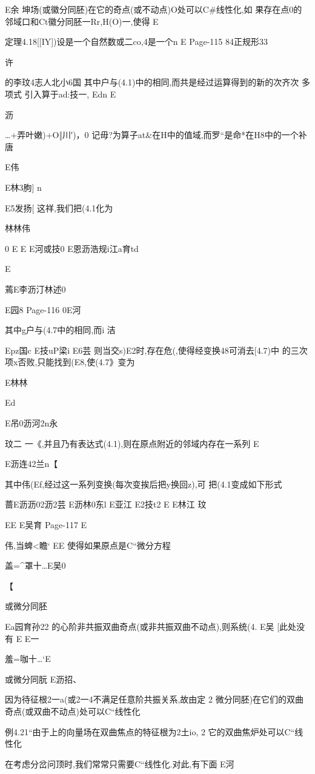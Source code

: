 {{E余
坤场(或徽分同胚)在它的奇点(或不动点)O处可以C#线性化,如
果存在点0的邻域口和Ct徽分同胚一Rr,H(O)一,使得
E

定理4.18[[IY])设是一个自然数或二co,4是一个n
E
Page-115
84正规形33

许

的李玟4志人北小6国
其中户与(4.1)中的相同,而共是经过运算得到的新的次齐次
多项式
引入算于ad:技一,
Edn
E

沥

…+弄叶嫩)+O‖川′)，0
记毋?为算子at&在H中的值域,而罗“是命*在H8中的一个补
唐

E伟

E林3朐]
n

E5发扬[
这祥,我们把(4.1化为

林林伟

0
E
E
E河或技0
E恩沥浩规i江a育td

E

蔫E李沥汀林述0

E园8
Page-116
0E河

其中g户与(4.7中的相同,而i
洁

Epz国c
E技uP梁i
E6芸
则当交s)E2时,存在危(,使得经变换48可消去[4.7)中
的三次项x否败,只能找到(E8,使(4.7》变为

E林林

Ed

E吊0沥河2n永

玟二
一《,并且乃有表达式(4.1),则在原点附近的邻域内存在一系列
E

E沥连42兰n【

其中伟(Ef,经过这一系列变换(每次变挨后把y换回z),可
把(4.1变成如下形式

蔷E沥沥02沥2芸
E沥林0东l
E亚江
E2技t2
E
E林江
玟

EE
E吴育
Page-117
E

伟,当蜱<瞻`
EE
使得如果原点是C“微分方程

盖=^罩十…E吴0

【

或微分同胚

Ea园育孙22
的心阶非共振双曲奇点(或非共振双曲不动点),则系统(4.
E吴
[此处没有
E
E一

羞=咖十…`E

或微分同朊
E沥招、

因为待征根2一a(或2一4不满足任意阶共振关系,故由定
2
微分同胚)在它们的双曲奇点(或双曲不动点)处可以C“线性化

例4.21“由于上的向量场在双曲焦点的特征根为2土io,
2
它的双曲焦炉处可以C“线性化

在考虑分岔问顶时,我们常常只需要C“线性化.对此,有下面
E河

}}
